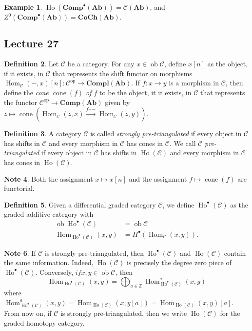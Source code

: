 \documentclass[10pt,letterpaper,cm]{nupset}
\theoremstyle{definition}
\newtheorem{definition}{Definition}[subsection]
\newtheorem{exmp}[definition]{Example}
\newtheorem{note}[definition]{Note}
\theoremstyle{theorem}
\theoremstyle{remark}
\newcommand{\Z}{\mathbb Z}
\newcommand{\1}{\mathbf{1}}
\renewcommand{\c}{\mathscr{C}}
\newcommand{\0}{\vec 0}
\DeclareMathOperator{\op}{op}
\DeclareMathOperator{\ob}{ob}
\DeclareMathOperator{\Hom}{Hom}
\DeclareMathOperator{\cone}{cone}
\DeclareMathOperator{\ho}{Ho}
\begin{document}
\begin{exmp}
$\ho(\mathbf{Comp}^{\bullet}(\mathbf{Ab})) = \mathcal{C}(\mathbf{Ab})$, and $Z^0(\mathbf{Comp}^{\bullet}(\mathbf{Ab})) = \mathbf{CoCh}(\mathbf{Ab})$.
\end{exmp}


\subsection{Lecture 27}

\begin{definition}
Let $\c$ be a category. For any $x\in \ob{\c}$, define $x[n]$ as the object, if it exists, in $\c$ that represents the shift functor on morphisms $\Hom_{\c}({-}, x)[n] :\c^{\op}\to \mathbf{Compl}(\mathbf{Ab})$. If $f : x\to y$ is a morphism in $\c$, then define the \textit{cone $\cone(f)$ of $f$} to be the object, it it exists, in $\c$ that represents the functor $\c^{\op} \to \mathbf{Comp}(\mathbf{Ab})$ given by $z \mapsto \cone(\Hom_{\c}(z,x) \overset{f \circ {-}}{\longrightarrow} \Hom_{\c}(z,y))$.  
\end{definition}

\begin{definition}
A category $\c$ is called \textit{strongly pre-triangulated} if every object in $\c$ has shifts in $\c$ and every morphism in $\c$ has cones in $\c$. We call $\c$ \textit{pre-triangulated} if every object in $\c$ has shifts in $\ho(\c)$ and every morphism in $\c$ has cones in $\ho(\c)$.
\end{definition}

\begin{note}
Both the assignment $x \mapsto x[n]$ and the assignment $f \mapsto \cone(f)$ are functorial. 
\end{note}

\begin{definition}
Given a differential graded category $\c$, we define $\ho^{\bullet}(\c)$ as the graded additive category with 
\begin{align*}
\ob{\ho^{\bullet}(\c)} & = \ob{\c}
\\ \Hom_{\ho^{\bullet}(\c)}(x,y) &= H^{\bullet}(\Hom_{\c}(x,y))
.\end{align*}
\end{definition}

\begin{note}
If $\c$ is strongly pre-triangulated, then $\ho^{\bullet}(\c)$ and $\ho(\c)$ contain the same information. Indeed, $\ho(\c)$ is precisely the degree zero piece of $\ho^{\bullet}(\c)$. Conversely, $if x,y \in \ob{\c}$, then $$\Hom_{\ho^{\bullet}(\c)}(x,y) = \bigoplus_{a\in \Z}\Hom^a_{\ho^{\bullet}(\c)}(x,y)$$ where $\Hom_{\ho^{\bullet}(\c)}^a(x,y)  =  \Hom_{\ho(\c)}(x, y[a]) = \Hom_{\ho(\c)}(x,y)[a]$. From now on, if $\c$ is strongly pre-triangulated, then we write $\ho(\c)$ for the graded homotopy category. 
\end{note}
\end{document}
